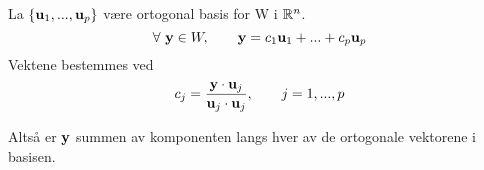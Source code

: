 La $\{ \mathbf{u}_1, ..., \mathbf{u}_p \}$ være ortogonal basis for W i $\mathbb{R}^n$.
$$\forall\ \mathbf{y}\in W, \qquad \mathbf{y} = c_1\mathbf{u}_1 + ... + c_p\mathbf{u}_p$$
Vektene bestemmes ved
$$c_j = \frac{\mathbf{y}\cdot\mathbf{u}_j}{\mathbf{u}_j\cdot\mathbf{u}_j}, \qquad j=1,...,p$$

Altså er $\mathbf{y}$ summen av komponenten langs hver av
de ortogonale vektorene i basisen.
